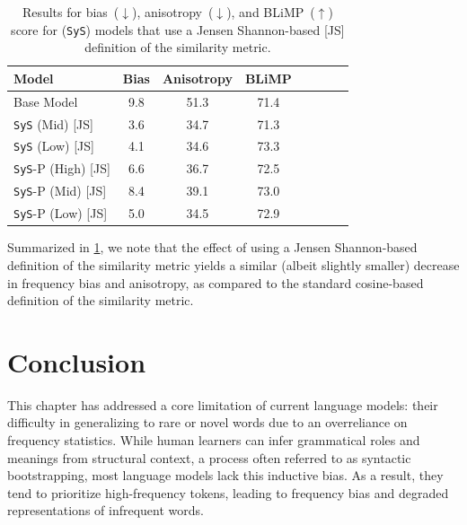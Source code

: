 \begin{table}[ht!]
\centering
\small
\begin{tabular}{l||cc|ccccc}
\toprule
\textbf{Model}  &  \textbf{Bias}  & \textbf{Anisotropy} & \textbf{BLiMP} \\
\midrule
Base Model & 9.8 & 51.3 & 71.4  \\
\midrule
\texttt{SyS} (Mid) \hspace{0.42cm} [JS]  & 3.6 & 34.7 & 71.3 \\
\texttt{SyS} (Low) \hspace{0.38cm} [JS]  & 4.1 & 34.6 & 73.3  \\
\texttt{SyS}-P (High) \hspace{0.05cm} [JS] & 6.6 & 36.7  & 72.5  \\ 
\texttt{SyS}-P (Mid) \hspace{0.15cm} [JS] & 8.4 & 39.1 &  73.0 \\ 
\texttt{SyS}-P (Low) \hspace{0.12cm} [JS] & 5.0 &  34.5 & 72.9 \\ 
\bottomrule
\end{tabular}
\caption{\label{tbl:jsd-similarity-metric-results}
Results for bias~($\downarrow$), anisotropy~($\downarrow$), and BLiMP~($\uparrow$) score for \smoothing (\texttt{SyS}) models that use a Jensen Shannon-based [JS] definition of the similarity metric.}
\end{table}

Summarized in \cref{tbl:jsd-similarity-metric-results}, we note that the effect of using a Jensen Shannon-based definition of the similarity metric yields a similar (albeit slightly smaller) decrease in frequency bias and anisotropy, as compared to the standard cosine-based definition of the similarity metric.   

\section{Conclusion}
\label{sec:conclusion}

This chapter has addressed a core limitation of current language models: their difficulty in generalizing to rare or novel words due to an overreliance on frequency statistics. While human learners can infer grammatical roles and meanings from structural context, a process often referred to as syntactic bootstrapping, most language models lack this inductive bias. As a result, they tend to prioritize high-frequency tokens, leading to frequency bias and degraded representations of infrequent words.

